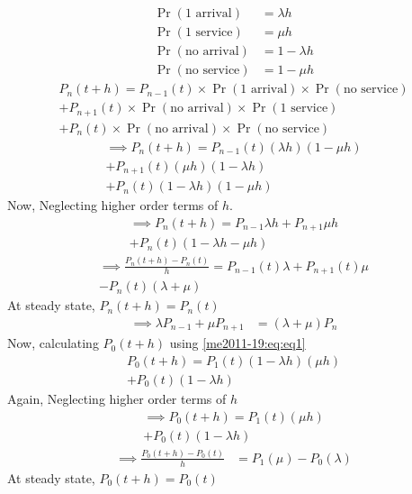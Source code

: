 \begin{itemize}
\begin{align}
    \Pr{(\text{1 arrival})}&=\lambda h\\
    \Pr{(\text{1 service})}&=\mu h\\
    \Pr{(\text{no arrival})}&=1-\lambda h\\
    \Pr{(\text{no service})}&=1-\mu h
\end{align}
\begin{multline}
    P_{n}(t+h)=P_{n-1}(t)\times\Pr{(\text{1 arrival})}\times\Pr{(\text{no service})}\\
    +P_{n+1}(t)\times\Pr{(\text{no arrival})}\times\Pr{(\text{1 service})}\\
    +P_n(t)\times\Pr{(\text{no arrival})}\times\Pr{(\text{no service})}\label{me2011-19:eq:eq1}
\end{multline}
\begin{multline}
    \implies P_{n}(t+h)=P_{n-1}(t)(\lambda h)(1-\mu h)\\
    +P_{n+1}(t)(\mu h)(1- \lambda h)\\
    +P_n(t)(1-\lambda h)(1-\mu h)
\end{multline}
Now, Neglecting higher order terms of $h$.
\begin{multline}
    \implies P_{n}(t+h)=P_{n-1}\lambda h+P_{n+1}\mu h\\
    +P_n(t)(1-\lambda h-\mu h)
\end{multline}
\begin{multline}
    \implies \frac{P_n(t+h)-P_n(t)}{h}=P_{n-1}(t)\lambda+P_{n+1}(t)\mu\\
    -P_n(t)(\lambda+\mu)
\end{multline}
At steady state, $P_n(t+h)=P_n(t)$
\begin{align}
    \implies\lambda P_{n-1}+\mu P_{n+1}&=(\lambda+\mu)P_n\label{me2011-19:eq:res1}
\end{align}
Now, calculating $P_0(t+h)$ using \eqref{me2011-19:eq:eq1}
\begin{multline}
    P_0(t+h)=P_1(t)(1-\lambda h)(\mu h)\\
    +P_0(t)(1-\lambda h)
\end{multline}
Again, Neglecting higher order terms of $h$
\begin{multline}
    \implies P_0(t+h)=P_1(t)(\mu h)\\
    +P_0(t)(1-\lambda h)
\end{multline}
\begin{align}
    \implies\frac{P_0(t+h)-P_0(t)}{h}&=P_1(\mu)-P_0(\lambda)
\end{align}
At steady state, $P_0(t+h)=P_0(t)$

\end{itemize}
